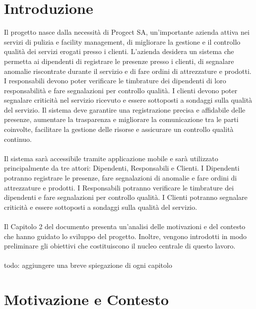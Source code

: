 \documentclass[twoside]{supsistudent}
\begin{document}
\chapter{Introduzione}

Il progetto nasce dalla necessità di Progect SA, un'importante azienda attiva nei servizi di pulizia e facility management, di migliorare la gestione e il controllo qualità dei servizi erogati presso i clienti. L'azienda desidera un sistema che permetta ai dipendenti di registrare le presenze presso i clienti, di segnalare anomalie riscontrate durante il servizio e di fare ordini di attrezzature e prodotti. I responsabili devono poter verificare le timbrature dei dipendenti di loro responsabilità e fare segnalazioni per controllo qualità. I clienti devono poter segnalare criticità nel servizio ricevuto e essere sottoposti a sondaggi sulla qualità del servizio. Il sistema deve garantire una registrazione precisa e affidabile delle presenze, aumentare la trasparenza e migliorare la comunicazione tra le parti coinvolte, facilitare la gestione delle risorse e assicurare un controllo qualità continuo.\\
\\
Il sistema sarà accessibile tramite applicazione mobile e sarà utilizzato principalmente da tre attori: Dipendenti, Responsabili e Clienti. I Dipendenti potranno registrare le presenze, fare segnalazioni di anomalie e fare ordini di attrezzature e prodotti. I Responsabili potranno verificare le timbrature dei dipendenti e fare segnalazioni per controllo qualità. I Clienti potranno segnalare criticità e essere sottoposti a sondaggi sulla qualità del servizio.\\
\\
Il Capitolo 2 del documento presenta un’analisi delle motivazioni e del contesto che hanno guidato lo sviluppo del progetto. Inoltre, vengono introdotti in modo preliminare gli obiettivi che costituiscono il nucleo centrale di questo lavoro.\\
\\
todo: aggiungere una breve spiegazione di ogni capitolo

\chapter{Motivazione e Contesto}
\end{document}
